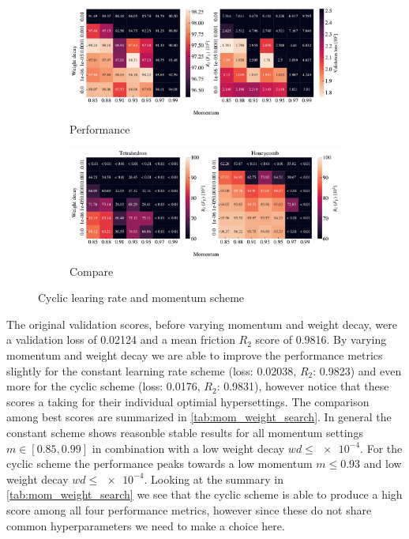 \begin{figure}[H]
  \centering
  \begin{subfigure}[t]{1.0\textwidth}
      \centering
      \includegraphics[width=\textwidth]{figures/ML/mom_weight_search_cyclic_perf.pdf}
      \caption{Performance}
  \end{subfigure}
  \hfill
  \begin{subfigure}[t]{1.0\textwidth}
      \centering
      \includegraphics[width=\textwidth]{figures/ML/mom_weight_search_compare_cyclic_perf.pdf}
      \caption{Compare}
  \end{subfigure}
  \hfill
  \caption{Cyclic learing rate and momentum scheme}
  \label{fig:mom_weight_search_cyclic}
\end{figure}




The original validation scores, before varying momentum and weight decay, were a validation loss of 0.02124 and a mean friction $R_2$ score of 0.9816. By varying momentum and weight decay we are able to improve the performance metrics slightly for the constant learning rate scheme (loss: 0.02038, $R_2$: 0.9823) and even more for the cyclic scheme (loss: 0.0176, $R_2$: 0.9831), however notice that these scores a taking for their individual optimial hypersettings. The comparison among best scores are summarized in \cref{tab:mom_weight_search}. In general the
constant scheme shows reasonble stable results for all momentum settings $m \in
[0.85, 0.99]$ in combination with a low weight decay $wd \le \num{e-4}$. For the cyclic scheme the performance peaks towards a low momentum $m \le 0.93$ and low weight decay $wd \le \num{e-4}$. Looking at the summary in \cref{tab:mom_weight_search} we see that the cyclic scheme is able to produce a high score among all four performance metrics, however since these do not share common hyperparameters we need to make a choice here. 

